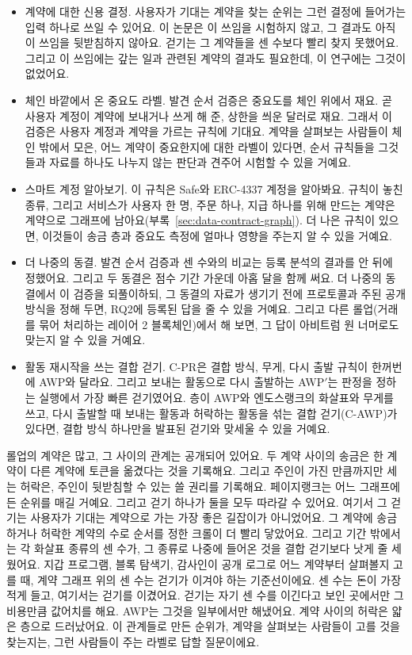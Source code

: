 \begin{itemize}
\item 계약에 대한 신용 결정. 사용자가 기대는 계약을 찾는 순위는 그런 결정에 들어가는 입력 하나로 쓰일 수 있어요. 이 논문은 이 쓰임을 시험하지 않고, 그 결과도 아직 이 쓰임을 뒷받침하지 않아요. 걷기는 그 계약들을 센 수보다 빨리 찾지 못했어요. 그리고 이 쓰임에는 갚는 일과 관련된 계약의 결과도 필요한데, 이 연구에는 그것이 없었어요.
\item 체인 바깥에서 온 중요도 라벨. 발견 순서 검증은 중요도를 체인 위에서 재요. 곧 사용자 계정이 계약에 보내거나 쓰게 해 준, 상한을 씌운 달러로 재요. 그래서 이 검증은 사용자 계정과 계약을 가르는 규칙에 기대요. 계약을 살펴보는 사람들이 체인 밖에서 모은, 어느 계약이 중요한지에 대한 라벨이 있다면, 순서 규칙들을 그것들과 자료를 하나도 나누지 않는 판단과 견주어 시험할 수 있을 거예요.
\item 스마트 계정 알아보기. 이 규칙은 Safe와 ERC-4337 계정을 알아봐요. 규칙이 놓친 종류, 그리고 서비스가 사용자 한 명, 주문 하나, 지급 하나를 위해 만드는 계약은 계약으로 그래프에 남아요(부록~\ref{sec:data-contract-graph}). 더 나은 규칙이 있으면, 이것들이 송금 층과 중요도 측정에 얼마나 영향을 주는지 알 수 있을 거예요.
\item 더 나중의 동결. 발견 순서 검증과 센 수와의 비교는 등록 분석의 결과를 안 뒤에 정했어요. 그리고 두 동결은 점수 기간 가운데 아홉 달을 함께 써요. 더 나중의 동결에서 이 검증을 되풀이하되, 그 동결의 자료가 생기기 전에 프로토콜과 주된 공개 방식을 정해 두면, RQ2에 등록된 답을 줄 수 있을 거예요. 그리고 다른 롤업(거래를 묶어 처리하는 레이어 2 블록체인)에서 해 보면, 그 답이 아비트럼 원 너머로도 맞는지 알 수 있을 거예요.
\item 활동 재시작을 쓰는 결합 걷기. \mbox{C-PR}은 결합 방식, 무게, 다시 출발 규칙이 한꺼번에 AWP와 달라요. 그리고 보내는 활동으로 다시 출발하는 AWP$'$는 판정을 정하는 실행에서 가장 빠른 걷기였어요. 층이 AWP와 엔도스랭크의 화살표와 무게를 쓰고, 다시 출발할 때 보내는 활동과 허락하는 활동을 섞는 결합 걷기(C-AWP)가 있다면, 결합 방식 하나만을 발표된 걷기와 맞세울 수 있을 거예요.
\end{itemize}


롤업의 계약은 많고, 그 사이의 관계는 공개되어 있어요. 두 계약 사이의 송금은 한 계약이 다른 계약에 토큰을 옮겼다는 것을 기록해요. 그리고 주인이 가진 만큼까지만 세는 허락은, 주인이 뒷받침할 수 있는 쓸 권리를 기록해요. 페이지랭크는 어느 그래프에든 순위를 매길 거예요. 그리고 걷기 하나가 둘을 모두 따라갈 수 있어요. 여기서 그 걷기는 사용자가 기대는 계약으로 가는 가장 좋은 길잡이가 아니었어요. 그 계약에 송금하거나 허락한 계약의 수로 순서를 정한 크롤이 더 빨리 닿았어요. 그리고 기간 밖에서는 각 화살표 종류의 센 수가, 그 종류로 나중에 들어온 것을 결합 걷기보다 낫게 줄 세웠어요. 지갑 프로그램, 블록 탐색기, 감사인이 공개 로그로 어느 계약부터 살펴볼지 고를 때, 계약 그래프 위의 센 수는 걷기가 이겨야 하는 기준선이에요. 센 수는 돈이 가장 적게 들고, 여기서는 걷기를 이겼어요. 걷기는 자기 센 수를 이긴다고 보인 곳에서만 그 비용만큼 값어치를 해요. AWP는 그것을 일부에서만 해냈어요. 계약 사이의 허락은 얇은 층으로 드러났어요. 이 관계들로 만든 순위가, 계약을 살펴보는 사람들이 고를 것을 찾는지는, 그런 사람들이 주는 라벨로 답할 질문이에요.
